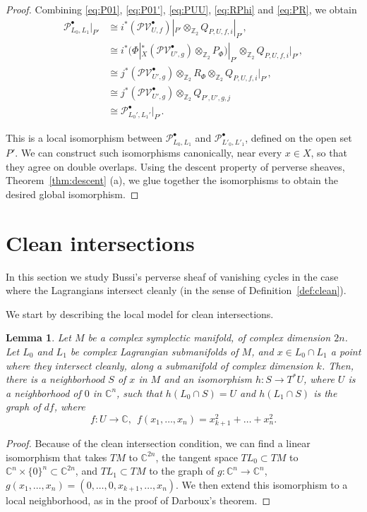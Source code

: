\documentclass [11pt]{amsart}
\newtheorem {lemma}[theorem]{Lemma}
\theoremstyle{remark}
\def\zz {{\mathbb{Z}}}
\def\cc {{\mathbb{C}}}
\def\C{\cc}
\def\Z {\zz}
\def\Pb {\mathcal{P}^\bullet}
\def\PVb {\mathcal{PV}^\bullet}
\begin{document}
\begin{proof}
Combining \eqref{eq:P01}, \eqref{eq:P01'}, \eqref{eq:PUU}, \eqref{eq:RPhi} and \eqref{eq:PR}, we obtain
\begin{align*}
 \Pb_{L_0, L_1}|_{P'} &\cong i^*(\PVb_{U, f})|_{P'} \otimes_{\Z_2} Q_{P, U, f, i}|_{P'},\\
&\cong i^*(\Phi|_X^*(\PVb_{U', g})  \otimes_{\Z_2} P_{\Phi} )|_{P'} \otimes_{\Z_2} Q_{P, U, f, i}|_{P'},\\
&\cong j^*(\PVb_{U', g})   \otimes_{\Z_2} R_{\Phi}  \otimes_{\Z_2} Q_{P, U, f, i}|_{P'},\\
&   \cong j^*(\PVb_{U', g}) \otimes_{\Z_2} Q_{P', U', g, j} \\
& \cong   \Pb_{L_0', L_1'}|_{P'}.
\end{align*}

This is a local isomorphism between $\Pb_{L_0, L_1}$ and $\Pb_{L'_0, L'_1}$, defined on the open set $P'$. We can construct such isomorphisms canonically, near every $x \in X$, so that they agree on double overlaps. Using the descent property of perverse sheaves, Theorem~\ref{thm:descent} (a), we glue together the isomorphisms to obtain the desired global isomorphism.
\end{proof}



\section{Clean intersections} 
\label{sec:Clean}
In this section we study Bussi's perverse sheaf of vanishing cycles in the case where the Lagrangians intersect cleanly (in the sense of Definition~\ref{def:clean}).

We start by describing the local model for clean intersections.
\begin{lemma}
\label{lem:lmClean}
Let $M$ be a complex symplectic manifold, of complex dimension $2n$. Let $L_0$ and $L_1$ be complex Lagrangian submanifolds of $M$, and $x \in L_0 \cap L_1$ a point where they intersect cleanly, along a submanifold of complex dimension $k$. Then, there is a neighborhood $S$ of $x$ in $M$ and an isomorphism $h: S \to T^*U$, where $U$ is a neighborhood of $0$ in $\C^n$, such that $h(L_0 \cap S) = U$ and $h(L_1 \cap S)$ is the graph of $df$, where 
$$f: U \to \C, \ \ f(x_1, \dots, x_n) = x_{k+1}^2 + \dots +x_n^2.$$
\end{lemma}

\begin{proof}
Because of the clean intersection condition, we can find a linear isomorphism that takes $TM$ to $\C^{2n}$, the tangent space $TL_0 \subset TM$ to $\C^n \times \{0\}^n \subset \C^{2n}$, and $TL_1 \subset TM$ to the graph of $g: \C^n \to \C^n$, $g(x_1, \dots, x_n)=(0, \dots, 0, x_{k+1},\dots, x_n).$
We then extend this isomorphism to a local neighborhood, as in the proof of Darboux's theorem.
\end{proof}
\end{document}
